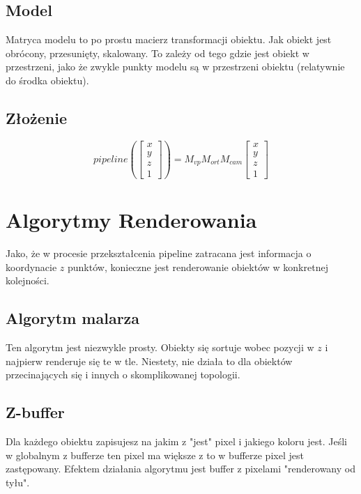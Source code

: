 \documentclass{../notatki}
\begin{document}
\subsection{Model}

Matryca modelu to po prostu macierz transformacji obiektu.
Jak obiekt jest obrócony, przesunięty, skalowany.
To zależy od tego gdzie jest obiekt w przestrzeni, jako że zwykle punkty modelu są w przestrzeni obiektu (relatywnie do środka obiektu).

\subsection{Złożenie}

$$
pipeline(\begin{bmatrix}x \\ y \\ z\\ 1\end{bmatrix}) = M_{vp}M_{ort}M_{cam}\begin{bmatrix}x \\ y \\ z\\ 1\end{bmatrix}
$$

\section{Algorytmy Renderowania}

Jako, że w procesie przekształcenia pipeline zatracana jest informacja o koordynacie $z$ punktów, konieczne jest renderowanie obiektów w konkretnej kolejności.

\subsection{Algorytm malarza}

Ten algorytm jest niezwykle prosty.
Obiekty się sortuje wobec pozycji w $z$ i najpierw renderuje się te w tle.
Niestety, nie działa to dla obiektów przecinających się i innych o skomplikowanej topologii.

\subsection{Z-buffer}

Dla każdego obiektu zapisujesz na jakim z "jest" pixel i jakiego koloru jest.
Jeśli w globalnym z bufferze ten pixel ma większe z to w bufferze pixel jest zastępowany.
Efektem działania algorytmu jest buffer z pixelami "renderowany od tyłu".
\end{document}
